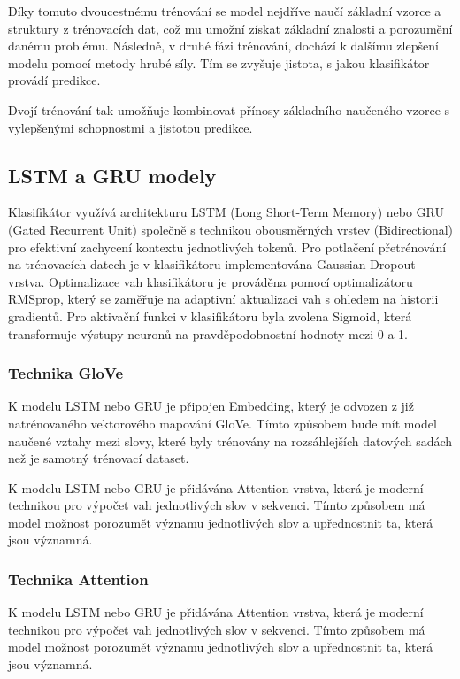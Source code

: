 Díky tomuto dvoucestnému trénování se model nejdříve naučí základní vzorce a struktury z trénovacích dat, což mu umožní získat základní znalosti a porozumění danému problému.
Následně, v druhé fázi trénování, dochází k dalšímu zlepšení modelu pomocí metody hrubé síly.
Tím se zvyšuje jistota, s jakou klasifikátor provádí predikce.

Dvojí trénování tak umožňuje kombinovat přínosy základního naučeného vzorce s vylepšenými schopnostmi a jistotou predikce.

\subsection{LSTM a GRU modely}
Klasifikátor využívá architekturu LSTM (Long Short-Term Memory) nebo GRU (Gated Recurrent Unit) společně s technikou obousměrných vrstev (Bidirectional) pro efektivní zachycení kontextu jednotlivých tokenů.
Pro potlačení přetrénování na trénovacích datech je v klasifikátoru implementována Gaussian-Dropout vrstva.
Optimalizace vah klasifikátoru je prováděna pomocí optimalizátoru RMSprop, který se zaměřuje na adaptivní aktualizaci vah s ohledem na historii gradientů.
Pro aktivační funkci v klasifikátoru byla zvolena Sigmoid, která transformuje výstupy neuronů na pravděpodobnostní hodnoty mezi 0 a 1.

\subsubsection{Technika GloVe}\label{subsec:Technika GloVe}
K modelu LSTM nebo GRU je připojen Embedding, který je odvozen z již natrénovaného vektorového mapování GloVe.
Tímto způsobem bude mít model naučené vztahy mezi slovy, které byly trénovány na rozsáhlejších datových sadách než je samotný trénovací dataset.

K modelu LSTM nebo GRU je přidávána Attention vrstva, která je moderní technikou pro výpočet vah jednotlivých slov v sekvenci.
Tímto způsobem má model možnost porozumět významu jednotlivých slov a upřednostnit ta, která jsou významná.

\subsubsection{Technika Attention}\label{subsec:Technika Attention}
K modelu LSTM nebo GRU je přidávána Attention vrstva, která je moderní technikou pro výpočet vah jednotlivých slov v sekvenci.
Tímto způsobem má model možnost porozumět významu jednotlivých slov a upřednostnit ta, která jsou významná.

